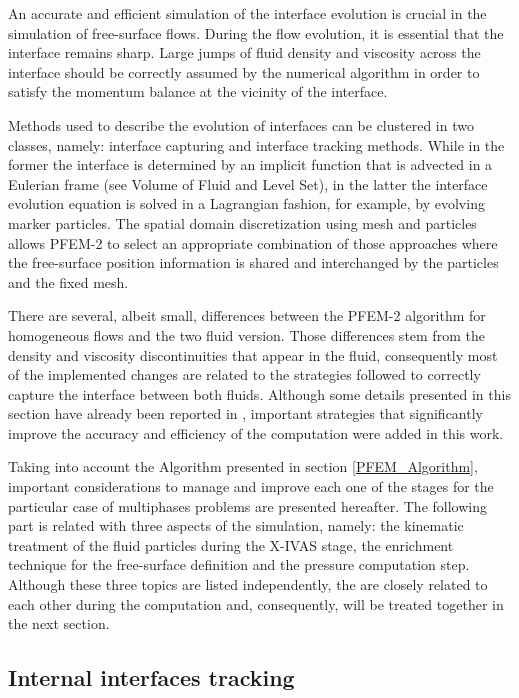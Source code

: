 An accurate and efficient simulation of the interface evolution is crucial in the simulation of free-surface flows. During the flow evolution, it is essential that the interface remains sharp. Large jumps of fluid density and viscosity across the interface should be correctly assumed by the numerical algorithm in order to satisfy the momentum balance at the vicinity of the interface.

Methods used to describe the evolution of interfaces can be clustered in two classes, namely: interface capturing and interface tracking methods. While in the former the interface is determined by an implicit function that is advected in a Eulerian frame (see Volume of Fluid \cite{VoF} and Level Set\cite{Osher01}), in the latter the interface evolution equation is solved in a Lagrangian fashion, for example, by evolving marker particles. The spatial domain discretization using mesh and particles allows PFEM-2 to select an appropriate combination of those approaches where the free-surface position information is shared and interchanged by the particles and the fixed mesh.

There are several, albeit small, differences between the PFEM-2 algorithm for homogeneous flows and the two fluid version. Those differences stem from the density and viscosity discontinuities that appear in the fluid, consequently most of the implemented changes are related to the strategies followed to correctly capture the interface between both fluids. Although some details presented in this section have already been reported in \cite{Idelsohn13c}, important strategies that significantly improve the accuracy and efficiency of the computation were added in this work.

Taking into account the Algorithm presented in section \ref{PFEM_Algorithm}, important considerations to manage and improve each one of the stages for the particular case of multiphases problems are presented hereafter. The following part is related with three aspects of the simulation, namely: the kinematic treatment of the fluid particles during the X-IVAS stage, the enrichment technique for the free-surface definition and the pressure computation step. Although these three topics are listed independently, the are closely related to each other during the computation and, consequently, will be treated together in the next section.

\subsection{Internal interfaces tracking}

